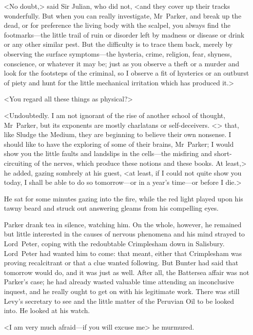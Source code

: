 <No doubt,> said Sir Julian, who did not, <and they cover up their tracks wonderfully. But when you can really investigate, Mr~Parker, and break up the dead, or for preference the living body with the scalpel, you always find the footmarks—the little trail of ruin or disorder left by madness or disease or drink or any other similar pest. But the difficulty is to trace them back, merely by observing the surface symptoms—the hysteria, crime, religion, fear, shyness, conscience, or whatever it may be; just as you observe a theft or a murder and look for the footsteps of the criminal, so I observe a fit of hysterics or an outburst of piety and hunt for the little mechanical irritation which has produced it.>

<You regard all these things as physical?>

<Undoubtedly. I am not ignorant of the rise of another school of thought, Mr~Parker, but its exponents are mostly charlatans or self-deceivers. <> that, like Sludge the Medium, they are beginning to believe their own nonsense. I should like to have the exploring of some of their brains, Mr~Parker; I would show you the little faults and landslips in the cells—the misfiring and short-circuiting of the nerves, which produce these notions and these books. At least,> he added, gazing sombrely at his guest, <at least, if I could not quite show you today, I shall be able to do so tomorrow—or in a year's time—or before I die.>

He sat for some minutes gazing into the fire, while the red light played upon his tawny beard and struck out answering gleams from his compelling eyes.

Parker drank tea in silence, watching him. On the whole, however, he remained but little interested in the causes of nervous phenomena and his mind strayed to Lord~Peter, coping with the redoubtable Crimplesham down in Salisbury. Lord~Peter had wanted him to come: that meant, either that Crimplesham was proving recalcitrant or that a clue wanted following. But Bunter had said that tomorrow would do, and it was just as well. After all, the Battersea affair was not Parker's case; he had already wasted valuable time attending an inconclusive inquest, and he really ought to get on with his legitimate work. There was still Levy's secretary to see and the little matter of the Peruvian Oil to be looked into. He looked at his watch.

<I am very much afraid—if you will excuse me\longdash> he murmured.

